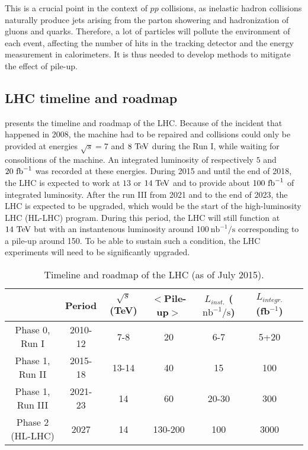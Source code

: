 
    This is a crucial point in the context of $pp$ collisions, as inelastic hadron collisions
    naturally produce jets arising from the parton showering and hadronization of gluons
    and quarks. Therefore, a lot of particles will pollute the environment of each event,
    affecting the number of hits in the tracking detector and the energy measurement in
    calorimeters. It is thus needed to develop methods to mitigate the effect of pile-up.

    \subsection{LHC timeline and roadmap}

     presents the timeline and roadmap of the LHC. Because of the
    incident that happened in 2008, the machine had to be repaired and collisions could
    only be provided at energies $\sqrt{s} = 7$ and $8~\text{TeV}$ during the Run I, while waiting for consolitions
    of the machine. An integrated luminosity of respectively $5$ and $20~\text{fb}^{-1}$ was recorded
    at these energies. During 2015 and until the end of 2018, the LHC is expected to work
    at $13$ or $14~\text{TeV}$ and to provide about $100~\text{fb}^{-1}$ of integrated luminosity. After
    the run III from 2021 and to the end of 2023, the LHC is expected to be upgraded,
    which would be the start of the high-luminosity LHC (HL-LHC) program. During this period,
    the LHC will still function at $14~\text{TeV}$ but with an instantenous luminosity around
    100$~\text{nb}^{-1} / \text{s}$ corresponding to a pile-up around 150. To be able to
    sustain such a condition, the LHC experiments will need to be significantly upgraded.

    \begin{table}[h]
        \begin{tabular}{|c|c|c|c|c|c|c|}
            \hline
            & Period
            & $\sqrt{s}$ (TeV)
            & $<$Pile-up$>$
            & $L_{inst.}$ ($\text{nb}^{-1} / \text{s}$)
            & $L_{integr.}$ (fb$^{-1}$) \\
            \hline
            Phase 0, Run I    & 2010-12 & 7-8   & 20      & 6-7   & 5+20\\
            \hline
            \hline
            Phase 1, Run II   & 2015-18 & 13-14 & 40      & 15    & 100\\
            Phase 1, Run III  & 2021-23 & 14    & 60      & 20-30 & 300\\
            \hline
            \hline
            Phase 2 (HL-LHC)  & 2027    & 14    & 130-200 & 100   & 3000\\
            \hline
        \end{tabular}
        \caption{Timeline and roadmap of the LHC (as of July 2015).\label{tab:LHCtimeline}}
    \end{table}


